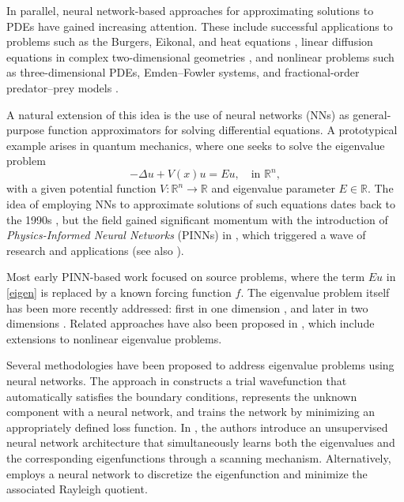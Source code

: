 \documentclass[11pt]{amsart}
\theoremstyle{definition}
\theoremstyle{remark}
\theoremstyle{plain}
\newcommand{\R}{\mathbb{R}}
\begin{document}
In parallel, neural network-based approaches for approximating solutions to PDEs have gained
increasing attention. These include successful applications to problems such as the Burgers,
Eikonal, and heat equations \cite{Blechschmidt-Ernst}, linear diffusion equations in complex
two-dimensional geometries \cite{Berg-Nystrom}, and nonlinear problems such as three-dimensional
PDEs, Emden--Fowler systems, and fractional-order predator--prey models \cite{GT24, KKG, MHO}.

A natural extension of this idea is the use of neural networks (NNs) as general-purpose function approximators for solving differential equations. A prototypical example arises in quantum mechanics, where one seeks to solve the eigenvalue problem
\begin{equation}\label{eigen}
-\Delta u + V(x) u = E u,\quad \text{in } \R^n,
\end{equation}
with a given potential function \( V \colon \R^n \to \R \) and eigenvalue parameter \( E \in \R \). The idea of employing NNs to approximate solutions of such equations dates back to the 1990s \cite{Lagaris-Likas-Fotiadis}, but the field gained significant momentum with the introduction of {\em Physics-Informed Neural Networks} (PINNs) in \cite{Raissi-Perdiakaris-Karniadakis}, which triggered a wave of research and applications (see also \cite{Karniadakis-etal}).

Most early PINN-based work focused on source problems, where the term \( E u \) in \eqref{eigen} is replaced by a known forcing function \( f \). The eigenvalue problem itself has been more recently addressed: first in one dimension \cite{Jin-Mattheakis-Protopapas1, Jin-Mattheakis-Protopapas2, Sakar}, and later in two dimensions \cite{Holliday-Lindner-Ditto}. Related approaches have also been proposed in \cite{Rowan-Evans-Maute-Dootsan}, which include extensions to nonlinear eigenvalue problems.


Several methodologies have been proposed to address eigenvalue problems using neural networks.
The approach in \cite{Sakar} constructs a trial wavefunction that automatically satisfies the boundary conditions, represents the unknown component with a neural network, and trains the network by minimizing an appropriately defined loss function.
%
In \cite{Jin-Mattheakis-Protopapas1, Jin-Mattheakis-Protopapas2}, the authors introduce an unsupervised neural network architecture that simultaneously learns both the eigenvalues and the corresponding eigenfunctions through a scanning mechanism.
%
Alternatively, \cite{Rowan-Evans-Maute-Dootsan} employs a neural network to discretize the eigenfunction and minimize the associated Rayleigh quotient.
\end{document}
